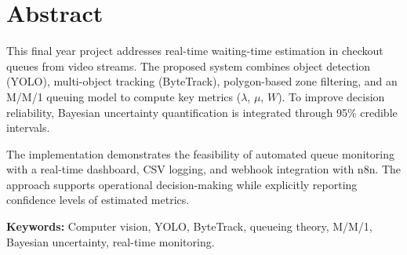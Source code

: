 \chapter*{Abstract}

This final year project addresses real-time waiting-time estimation in checkout queues from video streams.
The proposed system combines object detection (YOLO), multi-object tracking (ByteTrack), polygon-based zone filtering, and an M/M/1 queuing model to compute key metrics ($\lambda$, $\mu$, $W$).
To improve decision reliability, Bayesian uncertainty quantification is integrated through 95\% credible intervals.

The implementation demonstrates the feasibility of automated queue monitoring with a real-time dashboard, CSV logging, and webhook integration with n8n.
The approach supports operational decision-making while explicitly reporting confidence levels of estimated metrics.

\vspace{0.5cm}
\noindent\textbf{Keywords:} Computer vision, YOLO, ByteTrack, queueing theory, M/M/1, Bayesian uncertainty, real-time monitoring.
